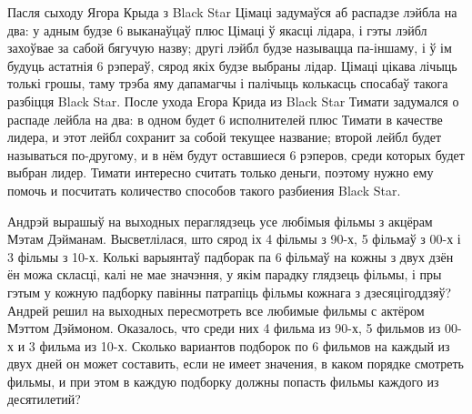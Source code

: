 \documentclass[12pt, a4paper]{article}
\begin{document}
\begin{problemList}
\bigskip

\problemItemSimple
{Пасля сыходу Ягора Крыда з Black Star Цімаці задумаўся аб распадзе лэйбла на два:
у адным будзе 6 выканаўцаў плюс Цімаці ў якасці лідара, і гэты лэйбл захоўвае за сабой бягучую назву;
другі лэйбл будзе называцца па-іншаму, і ў ім будуць астатнія 6 рэпераў, сярод якіх будзе выбраны лідар.
Цімаці цікава лічыць толькі грошы, таму трэба яму дапамагчы і палічыць колькасць спосабаў такога разбіцця Black Star.}
{После ухода Егора Крида из Black Star Тимати задумался о распаде лейбла на два:
в одном будет 6 исполнителей плюс Тимати в качестве лидера, и этот лейбл сохранит за собой текущее название;
второй лейбл будет называться по-другому, и в нём будут оставшиеся 6 рэперов, среди которых будет выбран лидер.
Тимати интересно считать только деньги, поэтому нужно ему помочь и посчитать количество способов такого разбиения Black Star.}

\bigskip

\problemItemSimple
{Андрэй вырашыў на выходных пераглядзець усе любімыя фільмы з акцёрам Мэтам Дэйманам.
Высветлілася, што сярод іх 4 фільмы з 90-х, 5 фільмаў з 00-х і 3 фільмы з 10-х.
Колькі варыянтаў падборак па 6 фільмаў на кожны з двух дзён ён можа скласці,
калі не мае значэння, у якім парадку глядзець фільмы,
і пры гэтым у кожную падборку павінны патрапіць фільмы кожнага з дзесяцігоддзяў?}
{Андрей решил на выходных пересмотреть все любимые фильмы с актёром Мэттом Дэймоном.
Оказалось, что среди них 4 фильма из 90-х, 5 фильмов из 00-х и 3 фильма из 10-х.
Сколько вариантов подборок по 6 фильмов на каждый из двух дней он может составить,
если не имеет значения, в каком порядке смотреть фильмы,
и при этом в каждую подборку должны попасть фильмы каждого из десятилетий?}

\end{problemList}
\end{document}
